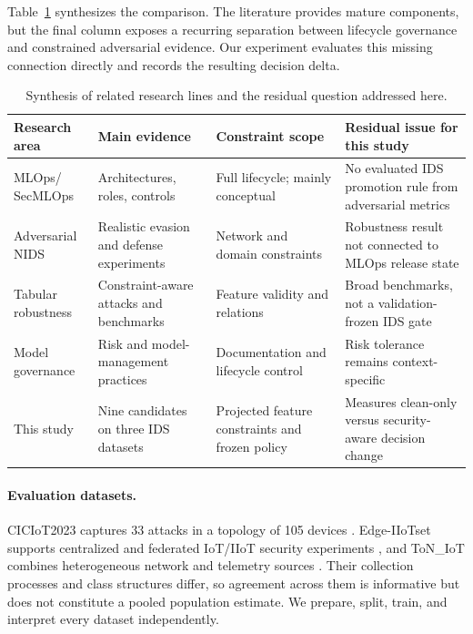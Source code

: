 \documentclass[runningheads]{llncs}
\begin{document}
Table~\ref{tab:related} synthesizes the comparison. The literature provides mature components, but the final column exposes a recurring separation between lifecycle governance and constrained adversarial evidence. Our experiment evaluates this missing connection directly and records the resulting decision delta.

\begin{table}[t]
\caption{Synthesis of related research lines and the residual question addressed here.}
\label{tab:related}
\centering\small
\begin{tabular}{>{\raggedright\arraybackslash}p{1.9cm}>{\raggedright\arraybackslash}p{2.9cm}>{\raggedright\arraybackslash}p{2.25cm}>{\raggedright\arraybackslash}p{4.0cm}}
\toprule
Research area & Main evidence & Constraint scope & Residual issue for this study\\
\midrule
MLOps/ SecMLOps \cite{kreuzberger2023mlops,zhang2026secmlops} & Architectures, roles, controls & Full lifecycle; mainly conceptual & No evaluated IDS promotion rule from adversarial metrics\\
Adversarial NIDS \cite{debicha2023advbot,alhussien2024constraining} & Realistic evasion and defense experiments & Network and domain constraints & Robustness result not connected to MLOps release state\\
Tabular robustness \cite{simonetto2024caa,simonetto2024tabularbench} & Constraint-aware attacks and benchmarks & Feature validity and relations & Broad benchmarks, not a validation-frozen IDS gate\\
Model governance & Risk and model-management practices \cite{tabassi2023airmf,latendresse2025management} & Documentation and lifecycle control & Risk tolerance remains context-specific\\
This study & Nine candidates on three IDS datasets & Projected feature constraints and frozen policy & Measures clean-only versus security-aware decision change\\
\bottomrule
\end{tabular}
\end{table}

\paragraph{Evaluation datasets.}
CICIoT2023 captures 33 attacks in a topology of 105 devices \cite{neto2023ciciot}. Edge-IIoTset supports centralized and federated IoT/IIoT security experiments \cite{ferrag2022edge}, and ToN\_IoT combines heterogeneous network and telemetry sources \cite{alsaedi2020ton}. Their collection processes and class structures differ, so agreement across them is informative but does not constitute a pooled population estimate. We prepare, split, train, and interpret every dataset independently.
\end{document}
